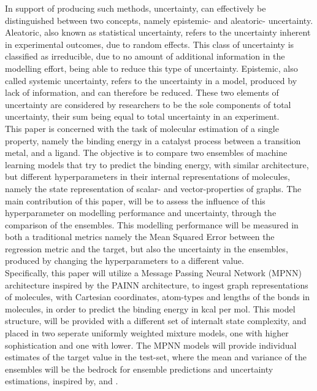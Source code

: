 In support of producing such methods, uncertainty, can effectively be distinguished between two concepts,
namely epistemic- and aleatoric- uncertainty\cite{Busk2021}\cite{AleatoricAndEpistemic}. Aleatoric, also known as statistical
uncertainty, refers to the uncertainty inherent in experimental outcomes, due to random effects. This class of uncertainty is
classified as irreducible, due to no amount of additional information in the modelling effort, being able to reduce this type
of uncertainty\cite{AleatoricAndEpistemic}. Epistemic, also called systemic uncertainty, refers to the uncertainty in a model,
produced by lack of information, and can therefore be reduced. These two elements of uncertainty are considered by researchers
to be the sole components of total uncertainty, their sum being equal to total uncertainty in an
experiment\cite{AleatoricAndEpistemic}.\\

This paper is concerned with the task of molecular estimation of a single property, namely the binding energy in a catalyst process
between a transition metal, and a ligand\cite{Meyer2018}. The objective is to compare two ensembles of machine learning models
that try to predict the binding energy, with similar architecture, but different hyperparameters in their internal representations
of molecules, namely the state representation of scalar- and vector-properties of graphs. The main contribution of this paper,
will be to assess the influence of this hyperparameter on modelling performance and uncertainty, through the comparison of the
ensembles. This modelling performance will be measured in both a traditional metrics namely the Mean Squared Error between the
regression metric and the target, but also the uncertainty in the ensembles, produced by changing the hyperparameters to
a different value. \\

Specifically, this paper will utilize a Message Passing Neural Network (MPNN) architecture inspired by the
PAINN architecture\cite{PAINN}, to ingest graph representations of molecules, with Cartesian coordinates, atom-types and lengths
of the bonds in molecules, in order to predict the binding energy in kcal per mol. This model structure, will be provided with
a different set of internalt state complexity, and placed in two seperate uniformly weighted mixture models, one with higher sophistication
and one with lower.
The MPNN models will provide individual estimates of the target value in the test-set, where the mean and variance of the ensembles
will be the bedrock for ensemble predictions and uncertainty estimations, inspired by\cite{Lakshminarayanan2016}, and \cite{Tran2019}.\\

